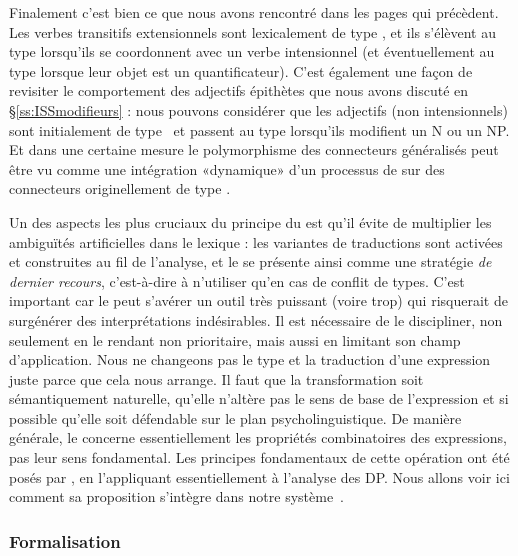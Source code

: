 Finalement c'est bien ce que nous avons rencontré dans les pages qui précèdent.  Les verbes transitifs extensionnels sont lexicalement de type \eet, et ils s'élèvent au type  lorsqu'ils se coordonnent avec un verbe intensionnel (et éventuellement au type \type{\ett,\et} lorsque leur objet est un quantificateur). 
C'est également une façon de revisiter le comportement des adjectifs épithètes que nous avons discuté en \S\ref{ss:ISSmodifieurs} : nous pouvons considérer que les adjectifs (non intensionnels) sont initialement de type \et\ et passent au type \type{\et,\et} lorsqu'ils modifient un N ou un NP. 
Et dans une certaine mesure le polymorphisme des connecteurs généralisés peut être vu comme une intégration «dynamique» d'un processus de  sur des connecteurs originellement de type .


Un des aspects les plus cruciaux du principe du  est qu'il évite de multiplier les ambiguïtés artificielles dans le lexique : les variantes de traductions sont activées et construites au fil de l'analyse, et le  se présente ainsi comme une stratégie \emph{de dernier recours}, c'est-à-dire à n'utiliser qu'en cas de conflit de types. 
C'est important car le  peut s'avérer un outil très puissant (voire trop) qui risquerait de surgénérer des interprétations indésirables. Il est nécessaire de le discipliner, non seulement en le rendant non prioritaire, mais aussi en limitant son champ d'application.  Nous ne changeons pas le type et la traduction d'une expression juste parce que cela nous arrange.  Il faut que la transformation soit sémantiquement naturelle, qu'elle n'altère pas le sens de base de l'expression et si possible qu'elle soit défendable sur le plan psycholinguistique.  
De manière générale, le  concerne essentiellement les propriétés combinatoires des expressions, pas leur sens fondamental.
Les principes fondamentaux de cette opération ont été posés par 
\citet{Partee:87}, en l'appliquant essentiellement à l'analyse des DP.  Nous allons voir ici comment sa proposition s'intègre dans notre système~{\LO}. 



\subsubsection{Formalisation}

